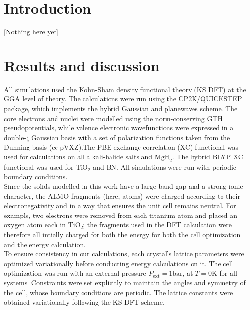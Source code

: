 \documentclass[aps,prb,twocolumn,amsmath,amssymb,superscriptaddress,longbibliography]{revtex4-1}
\begin{document}
\section{Introduction} 

[Nothing here yet]



\section*{Results and discussion}
 
All simulations used the Kohn-Sham density functional theory (KS DFT) at the GGA level of theory. 
The calculations were run using the CP2K/QUICKSTEP package\cite{cp2k}, which implements the hybrid Gaussian and planewaves scheme\cite{gpw}. 
The core electrons and nuclei were modelled using the norm-conserving GTH pseudopotentials\cite{gth1,gth2}, while valence electronic wavefunctions were expressed in a $\text{double-}\zeta$  Gaussian basis \cite{gaussian} with a set of polarization functions taken from the Dunning basis (cc-pVXZ)\cite{pol,qs}.The PBE exchange-correlation (XC) functional\cite{pbe} was used for calculations on all alkali-halide salts and $\text{MgH}_{2}$. 
The hybrid BLYP XC functional\cite{becke,lyp} was used for $\text{TiO}_{2}$ and BN. 
All simulations were run with periodic boundary conditions.\\

Since the solids modelled in this work have a large band gap and a strong ionic character, the ALMO fragments (here, atoms) were charged according to their electronegativity and in a way that ensures the unit cell remains neutral. 
For example, two electrons were removed from each titanium atom and placed an oxygen atom each in $\text{TiO}_{2}$; the fragments used in the DFT calculation were therefore all intially charged for both the energy for both the cell optimization and the energy calculation.\\  


To ensure consistency in our calculations, each crystal's lattice parameters were optimized variationally before conducting energy calculations on it. 
The cell optimization was run with an external pressure $P_{\text{ext}} = 1 \text{bar}$, at $T = 0 \text{K}$ for all systems. 
Constraints were set explicitly to maintain the angles and symmetry of the cell, whose boundary conditions are periodic. 
The lattice constants were obtained variationally following the KS DFT scheme.\\ 
\end{document}
